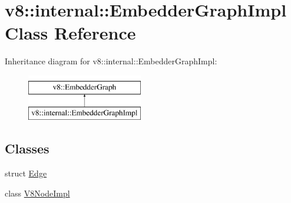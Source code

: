\hypertarget{classv8_1_1internal_1_1EmbedderGraphImpl}{}\section{v8\+:\+:internal\+:\+:Embedder\+Graph\+Impl Class Reference}
\label{classv8_1_1internal_1_1EmbedderGraphImpl}
Inheritance diagram for v8\+:\+:internal\+:\+:Embedder\+Graph\+Impl\+:\begin{figure}[H]
\begin{center}
\leavevmode
\includegraphics[height=2.000000cm]{classv8_1_1internal_1_1EmbedderGraphImpl}
\end{center}
\end{figure}
\subsection*{Classes}
\begin{DoxyCompactItemize}
\item 
struct \mbox{\hyperlink{structv8_1_1internal_1_1EmbedderGraphImpl_1_1Edge}{Edge}}
\item 
class \mbox{\hyperlink{classv8_1_1internal_1_1EmbedderGraphImpl_1_1V8NodeImpl}{V8\+Node\+Impl}}
\end{DoxyCompactItemize}
